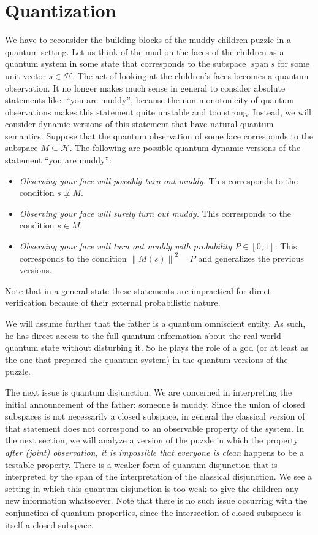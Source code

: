 \documentclass[a4paper]{article}
\newcommand{\HH}{\mathcal{H}}
\DeclareMathOperator{\spn}{span}
\newcommand{\ppar}[1]{#1}
\newcommand{\norm}[1]{\left\lVert#1\right\rVert}
\begin{document}
\section*{Quantization}
We have to reconsider the building blocks of the muddy children puzzle in a
quantum setting. Let us think of the mud on the faces of the children as a
quantum system in some state that corresponds to the subspace $\spn{s}$ for some
unit vector $s \in \HH$. The act of looking at the children's faces becomes a
quantum observation.  It no longer makes much sense in general to consider
absolute statements like: ``you are muddy'', because the non-monotonicity of
quantum observations makes this statement quite unstable and too strong.
Instead, we will consider dynamic versions of this statement that have natural
quantum semantics. Suppose that the quantum observation of some face corresponds
to the subspace $M \subseteq \HH$. The following are possible quantum dynamic 
versions of the statement ``you are muddy'':

\begin{itemize}
\item \emph{Observing your face will possibly turn out muddy.}
    This corresponds to the condition $s \not\perp M$.
\item \emph{Observing your face will surely turn out muddy.}
    This corresponds to the condition $s \in M$.
\item \emph{Observing your face will turn out muddy with probability $P \in
    [0,1]$.} 
    This corresponds to the condition $\norm{\ppar{M}(s)}^2 = P$ and generalizes
    the previous versions.
\end{itemize}
Note that in a general state these statements are impractical for direct 
verification because of their external probabilistic nature.

We will assume further that the father is a quantum omniscient entity. As such,
he has direct access to the full quantum information about the real world
quantum state without disturbing it. So he plays the role of a god (or at least
as the one that prepared the quantum system) in the quantum versions of the
puzzle.

The next issue is quantum disjunction. We are concerned in interpreting the
initial announcement of the father: someone is muddy. Since the union of closed
subspaces is not necessarily a closed subspace, in general the classical version
of that statement does not correspond to an observable property of the system.
In the next section, we will analyze a version of the puzzle in which the
property \emph{after (joint) observation, it is impossible that everyone is
clean} happens to be a testable property. There is a weaker form of quantum
disjunction that is interpreted by the span of the interpretation of the
classical disjunction. We see a setting in which this quantum disjunction is too
weak to give the children any new information whatsoever. Note that there is no
such issue occurring with the conjunction of quantum properties, since the
intersection of closed subspaces is itself a closed subspace.
\end{document}
